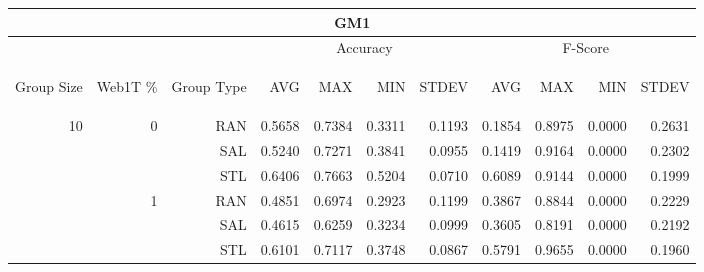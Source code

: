 \begin{center}
\begin{table}[htbp] 
 \begin{center}
\begin{tabular}{ | r | r | r | r | r | r | r | r | r | r | r |}
\hline
\multicolumn{11}{|c|}{GM1}\\
\hline
 & & & \multicolumn{4}{|c|}{Accuracy} & \multicolumn{4}{|c|}{F-Score}\\ \cline{4-11}
\begin{sideways}Group Size\end{sideways} & \begin{sideways}Web1T \%\end{sideways} & \begin{sideways}Group Type\end{sideways} & \begin{sideways}AVG\end{sideways} & \begin{sideways}MAX\end{sideways} & \begin{sideways}MIN\end{sideways} & \begin{sideways}STDEV\end{sideways} & \begin{sideways}AVG\end{sideways} & \begin{sideways}MAX\end{sideways} & \begin{sideways}MIN\end{sideways} & \begin{sideways}STDEV\end{sideways}\\
\hline
\multirow{18}{*}{10}
 & \multirow{3}{*}{0} & RAN & 0.5658 & 0.7384 & 0.3311 & 0.1193 & 0.1854 & 0.8975 & 0.0000 & 0.2631\\ \cline{3-11}
 &   & SAL & 0.5240 & 0.7271 & 0.3841 & 0.0955 & 0.1419 & 0.9164 & 0.0000 & 0.2302\\ \cline{3-11}
 &   & STL & 0.6406 & 0.7663 & 0.5204 & 0.0710 & 0.6089 & 0.9144 & 0.0000 & 0.1999\\ \cline{2-11}
 & \multirow{3}{*}{1} & RAN & 0.4851 & 0.6974 & 0.2923 & 0.1199 & 0.3867 & 0.8844 & 0.0000 & 0.2229\\ \cline{3-11}
 &   & SAL & 0.4615 & 0.6259 & 0.3234 & 0.0999 & 0.3605 & 0.8191 & 0.0000 & 0.2192\\ \cline{3-11}
 &   & STL & 0.6101 & 0.7117 & 0.3748 & 0.0867 & 0.5791 & 0.9655 & 0.0000 & 0.1960\\ \cline{2-11}

\end{tabular}
\end{center}
\end{table}
\end{center}
